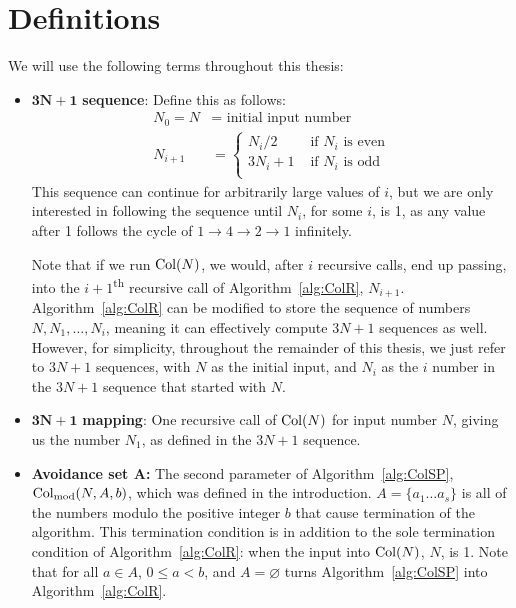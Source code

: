 \chapter{Definitions} \label{sec:defns}
We will use the following terms throughout this thesis:
\begin{itemize}
    \item $\boldsymbol{3N+1}$\textbf{ sequence}: Define this as follows: 
    \begin{align*}
        N_0 = N &= \text{ initial input number} \\
        N_{i+1} &= \begin{cases} 
        N_{i}/2 &\text{ if $N_i$ is even} \\
        3 N_{i} + 1 &\text{ if $N_i$ is odd} \\
        \end{cases}
    \end{align*}
    This sequence can continue for arbitrarily large values of $i$, but we are only interested in following the sequence until $N_i$, for some $i$, is 1, as any value after 1 follows the cycle of $1 \rightarrow 4 \rightarrow 2 \rightarrow 1$ infinitely. \par
    Note that if we run $\mathrm{Col}(N)$, we would, after $i$ recursive calls, end up passing, into the $i+1$\textsuperscript{th} recursive call of Algorithm~\ref{alg:ColR}, $N_{i+1}$. Algorithm~\ref{alg:ColR} can be modified to store the sequence of numbers $N, N_1, \ldots, N_i$, meaning it can effectively compute $3N+1$ sequences as well. However, for simplicity, throughout the remainder of this thesis, we just refer to $3N+1$ sequences, with $N$ as the initial input, and $N_i$ as the $i$ number in the $3N+1$ sequence that started with $N$.
    \item $\boldsymbol{3N+1}$\textbf{ mapping}: One recursive call of $\mathrm{Col}(N)$ for input number $N$, giving us the number $N_1$, as defined in the $3N+1$ sequence.
    \item \textbf{Avoidance set $\boldsymbol A$:} The second parameter of Algorithm~\ref{alg:ColSP}, $\mathrm{Col}_{\text{mod}}(N,A,b)$, which was defined in the introduction. $A = \{a_1 \ldots a_s\}$ is all of the numbers modulo the positive integer $b$ that cause termination of the algorithm. This termination condition is in addition to the sole termination condition of Algorithm~\ref{alg:ColR}: when the input into $\mathrm{Col}(N)$, $N$, is 1. Note that for all $a \in A$, $0 \le a < b$, and $A = \varnothing$ turns Algorithm~\ref{alg:ColSP} into Algorithm~\ref{alg:ColR}.

\end{itemize}
